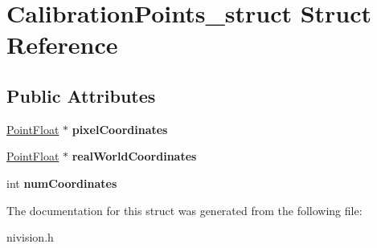 \hypertarget{structCalibrationPoints__struct}{\section{\-Calibration\-Points\-\_\-struct \-Struct \-Reference}
\label{structCalibrationPoints__struct}
}
\subsection*{\-Public \-Attributes}
\begin{DoxyCompactItemize}
\item 
\hypertarget{structCalibrationPoints__struct_ad3b3997a9943c1ff9bbc69879f91b118}{\hyperlink{structPointFloat__struct}{\-Point\-Float} $\ast$ {\bfseries pixel\-Coordinates}}\label{structCalibrationPoints__struct_ad3b3997a9943c1ff9bbc69879f91b118}

\item 
\hypertarget{structCalibrationPoints__struct_aa54609acfcbc76366079d4c4f8f3ca43}{\hyperlink{structPointFloat__struct}{\-Point\-Float} $\ast$ {\bfseries real\-World\-Coordinates}}\label{structCalibrationPoints__struct_aa54609acfcbc76366079d4c4f8f3ca43}

\item 
\hypertarget{structCalibrationPoints__struct_a73616df3da2f846673b2f3b4d918c4d9}{int {\bfseries num\-Coordinates}}\label{structCalibrationPoints__struct_a73616df3da2f846673b2f3b4d918c4d9}

\end{DoxyCompactItemize}


\-The documentation for this struct was generated from the following file\-:\begin{DoxyCompactItemize}
\item 
nivision.\-h\end{DoxyCompactItemize}

